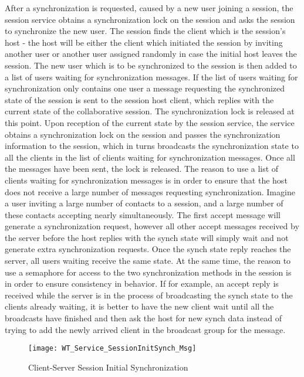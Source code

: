 After a synchronization is requested, caused by a new user joining a session, the session service obtains a synchronization lock on the session and asks the session to synchronize the new user. The session finds the client which is the session's host - the host will be either the client which initiated the session by inviting another user or another user assigned randomly in case the initial host leaves the session. The new user which is to be synchronized to the session is then added to a list of users waiting for synchronization messages. If the list of users waiting for synchronization only contains one user a message requesting the synchronized state of the session is sent to the session host client, which replies with the current state of the collaborative session. The synchronization lock is released at this point. Upon reception of the current state by the session service, the service obtains a synchronization lock on the session and passes the synchronization information to the session, which in turns broadcasts the synchronization state to all the clients in the list of clients waiting for synchronization messages. Once all the messages have been sent, the lock is released. The reason to use a list of clients waiting for synchronization messages is in order to ensure that the host does not receive a large number of messages requesting synchronization. Imagine a user inviting a large number of contacts to a session, and a large number of these contacts accepting nearly simultaneously. The first accept message will generate a synchronization request, however all other accept messages received by the server before the host replies with the synch state will simply wait and not generate extra synchronization requests. Once the synch state reply reaches the server, all users waiting receive the same state. At the same time, the reason to use a semaphore for access to the two synchronization methods in the session is in order to ensure consistency in behavior. If for example, an accept reply is received while the server is in the process of broadcasting the synch state to the clients already waiting, it is better to have the new client wait until all the broadcasts have finished and then ask the host for new synch data instead of trying to add the newly arrived client in the broadcast group for the message.

\begin{figure}
	\centering
	\texttt{[image: WT\_Service\_SessionInitSynch\_Msg]}
	\caption{Client-Server Session Initial Synchronization}
	\label{fig:sesssynchinitdiag}
\end{figure}

